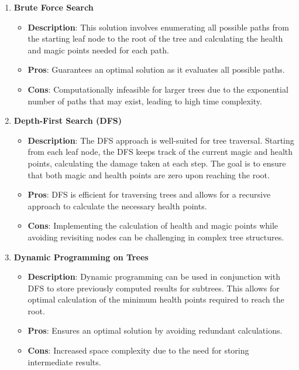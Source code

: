 \documentclass{article}
\begin{document}
\begin{enumerate}
    \item \textbf{Brute Force Search}
    \begin{itemize}
        \item \textbf{Description}: This solution involves enumerating all possible paths from the starting leaf node to the root of the tree and calculating the health and magic points needed for each path.
        \item \textbf{Pros}: Guarantees an optimal solution as it evaluates all possible paths.
        \item \textbf{Cons}: Computationally infeasible for larger trees due to the exponential number of paths that may exist, leading to high time complexity.
    \end{itemize}

    \item \textbf{Depth-First Search (DFS)}
    \begin{itemize}
        \item \textbf{Description}: The DFS approach is well-suited for tree traversal. Starting from each leaf node, the DFS keeps track of the current magic and health points, calculating the damage taken at each step. The goal is to ensure that both magic and health points are zero upon reaching the root.
        \item \textbf{Pros}: DFS is efficient for traversing trees and allows for a recursive approach to calculate the necessary health points.
        \item \textbf{Cons}: Implementing the calculation of health and magic points while avoiding revisiting nodes can be challenging in complex tree structures.
    \end{itemize}

    \item \textbf{Dynamic Programming on Trees}
    \begin{itemize}
        \item \textbf{Description}: Dynamic programming can be used in conjunction with DFS to store previously computed results for subtrees. This allows for optimal calculation of the minimum health points required to reach the root.
        \item \textbf{Pros}: Ensures an optimal solution by avoiding redundant calculations.
        \item \textbf{Cons}: Increased space complexity due to the need for storing intermediate results.
    \end{itemize}
\end{enumerate}
\end{document}
